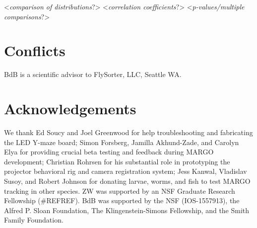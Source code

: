 \documentclass[10pt]{article}
\begin{document}
\begin{multicols}{2}
<\textit{comparison of distributions}?>
<\textit{correlation coefficients}?>
<\textit{p-values/multiple comparisons}?>

\section*{Conflicts}

BdB is a scientific advisor to FlySorter, LLC, Seattle WA.

\section*{Acknowledgements}

We thank Ed Soucy and Joel Greenwood for help troubleshooting and fabricating the LED Y-maze board; Simon Forsberg, Jamilla Akhund-Zade, and Carolyn Elya for providing crucial beta testing and feedback during MARGO development; Christian Rohrsen for his substantial role in prototyping the projector behavioral rig and camera registration system; Jess Kanwal, Vladislav Susoy, and Robert Johnson for donating larvae, worms, and fish to test MARGO tracking in other species. ZW was supported by an NSF Graduate Research Fellowship (#REFREF). BdB was supported by the NSF (IOS-1557913), the Alfred P. Sloan Foundation, The Klingenstein-Simons Fellowship, and the Smith Family Foundation. 

 
\end{multicols}
\end{document}
